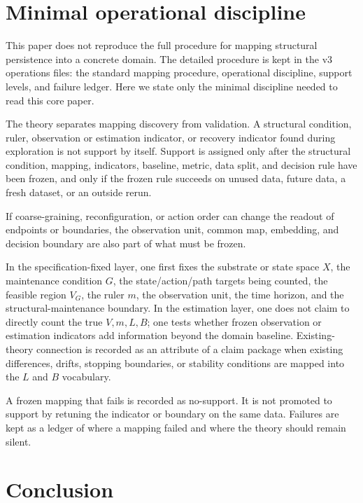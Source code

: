\documentclass[12pt,a4paper]{article}
\begin{document}
\section{Minimal operational discipline}\label{minimal-operational-discipline}

This paper does not reproduce the full procedure for mapping structural persistence into a concrete domain. The detailed procedure is kept in the v3 operations files: the standard mapping procedure, operational discipline, support levels, and failure ledger. Here we state only the minimal discipline needed to read this core paper.

The theory separates mapping discovery from validation. A structural condition, ruler, observation or estimation indicator, or recovery indicator found during exploration is not support by itself. Support is assigned only after the structural condition, mapping, indicators, baseline, metric, data split, and decision rule have been frozen, and only if the frozen rule succeeds on unused data, future data, a fresh dataset, or an outside rerun.

If coarse-graining, reconfiguration, or action order can change the readout of endpoints or boundaries, the observation unit, common map, embedding, and decision boundary are also part of what must be frozen.

In the specification-fixed layer, one first fixes the substrate or state space \(X\), the maintenance condition \(G\), the state/action/path targets being counted, the feasible region \(V_{G}\), the ruler \(m\), the observation unit, the time horizon, and the structural-maintenance boundary. In the estimation layer, one does not claim to directly count the true \(V,m,L,B\); one tests whether frozen observation or estimation indicators add information beyond the domain baseline. Existing-theory connection is recorded as an attribute of a claim package when existing differences, drifts, stopping boundaries, or stability conditions are mapped into the \(L\) and \(B\) vocabulary.

A frozen mapping that fails is recorded as no-support. It is not promoted to support by retuning the indicator or boundary on the same data. Failures are kept as a ledger of where a mapping failed and where the theory should remain silent.

\section{Conclusion}\label{conclusion}
\end{document}

